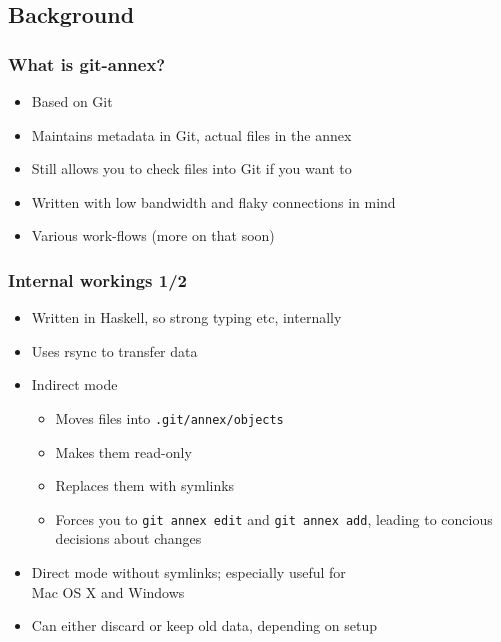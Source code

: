 \documentclass[t]{beamer}
\begin{document}
\subsection{Background}

\begin{frame}
	\frametitle{What is git-annex?}
	\begin{itemize}
		\item Based on Git
		\item Maintains metadata in Git, actual files in the annex
		\item Still allows you to check files into Git if you want to
		\item Written with low bandwidth and flaky connections in mind
		\item Various work-flows (more on that soon)
	\end{itemize}
\end{frame}

\begin{frame}
	\frametitle{Internal workings 1/2}
	\begin{itemize}
		\item Written in Haskell, so strong typing etc, internally
		\item Uses rsync to transfer data
		\item Indirect mode
		\begin{itemize}
			\item Moves files into \texttt{.git/annex/objects}
			\item Makes them read-only
			\item Replaces them with symlinks
			\item Forces you to \texttt{git annex edit} and \texttt{git annex add}, leading to concious decisions about changes
		\end{itemize}
		\item Direct mode without symlinks; especially useful for \\
			Mac OS X and Windows
		\item Can either discard or keep old data, depending on setup
	\end{itemize}
\end{frame}
\end{document}
